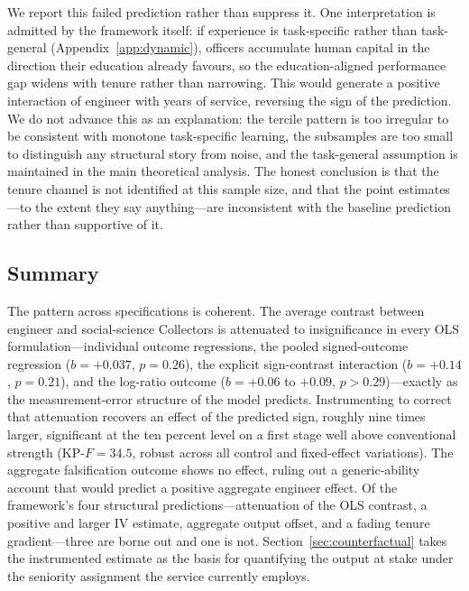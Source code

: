 We report this failed prediction rather than suppress it. One interpretation is
admitted by the framework itself: if experience is task-specific rather than
task-general (Appendix~\ref{app:dynamic}), officers accumulate human capital in the
direction their education already favours, so the education-aligned performance gap
widens with tenure rather than narrowing. This would generate a positive interaction
of engineer with years of service, reversing the sign of the prediction. We do not
advance this as an explanation: the tercile pattern is too irregular to be consistent
with monotone task-specific learning, the subsamples are too small to distinguish any
structural story from noise, and the task-general assumption is maintained in the
main theoretical analysis. The honest conclusion is that the tenure channel is not
identified at this sample size, and that the point estimates---to the extent they say
anything---are inconsistent with the baseline prediction rather than supportive of it.

\subsection{Summary}
\label{sec:results-summary}

The pattern across specifications is coherent. The average contrast between engineer
and social-science Collectors is attenuated to insignificance in every OLS
formulation---individual outcome regressions, the pooled signed-outcome regression
($b=+0.037$, $p=0.26$), the explicit sign-contrast interaction ($b=+0.14$, $p=0.21$),
and the log-ratio outcome ($b=+0.06$ to $+0.09$, $p>0.29$)---exactly as the
measurement-error structure of the model predicts. Instrumenting to correct that
attenuation recovers an effect of the predicted sign, roughly nine times larger,
significant at the ten percent level on a first stage well above conventional strength
(KP-$F=34.5$, robust across all control and fixed-effect variations). The aggregate
falsification outcome shows no effect, ruling out a generic-ability account that would
predict a positive aggregate engineer effect. Of the framework's four structural
predictions---attenuation of the OLS contrast, a positive and larger IV estimate,
aggregate output offset, and a fading tenure gradient---three are borne out and one
is not. Section~\ref{sec:counterfactual} takes the instrumented estimate as the basis
for quantifying the output at stake under the seniority assignment the service currently
employs.
